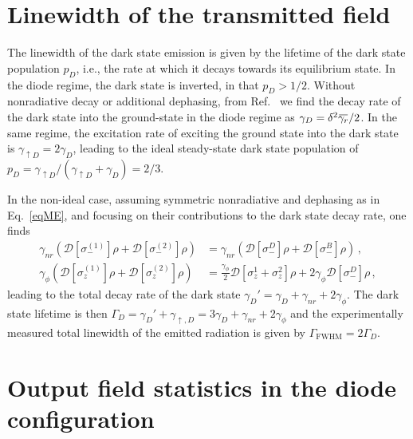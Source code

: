 \documentclass[pra, twocolumn, amsmath, amssymb, notitlepage, longbibliography, showpacs, superscriptaddress]{revtex4-1}
\newcommand{\nn}{\nonumber}							%
\newcommand{\diss}[1]{\mathcal{D}[ #1 ]}					%
\renewcommand{\l}[0]{\left}
\renewcommand{\r}[0]{\right}
\newcommand{\overbar}[1]{\mkern 1.5mu\overline{\mkern-1.5mu#1\mkern-1.5mu}\mkern 1.5mu}
\begin{document}
\section{Linewidth of the transmitted field}

The linewidth of the dark state emission is given by the lifetime of the 
dark state population $p_{D}$, i.e., the rate at which it decays towards its equilibrium state. 
In the diode regime, the dark state is inverted, in that $p_{D}>1/2$. Without nonradiative decay or additional dephasing, from Ref.~\cite{Muller2017a} we find
the decay rate of the dark state into the ground-state in the diode regime as 
$\gamma_{D} = \delta^{2} \overbar{\gamma_{r}} /2$. 
In the same regime, the excitation rate of exciting the 
ground state into the dark state is $\gamma_{\uparrow D} = 2\gamma_{D}$, 
leading to the ideal steady-state dark state population of 
$p_{D} = \gamma_{\uparrow D} / (\gamma_{\uparrow D} + \gamma_{D})  = 2/3$. 

In the non-ideal case, assuming symmetric nonradiative and dephasing as in Eq.~\eqref{eqME}, 
and focusing on their contributions to the dark state decay rate, 
one finds 
\begin{align}
	\gamma_{nr} \l( \diss{\sigma_{-}^{(1)}}\rho + \diss{\sigma_{-}^{(2)}}\rho \r) &= \gamma_{nr} \l( \diss{\sigma_{-}^{D}}\rho +\diss{\sigma_{-}^{B}}\rho \r) \,, \\
	\gamma_{\phi} \l( \diss{\sigma_{z}^{(1)}}\rho + \diss{\sigma_{z}^{(2)}}\rho \r) %
		&= \frac{\gamma_{\phi}}{2} \diss{\sigma_{z}^{1}+\sigma_{z}^{2}}\rho +2 \gamma_{\phi} \diss{\sigma_{-}^{D}}\rho \,, 
\end{align}
leading to the total decay rate of the dark state $\gamma_{D}' = \gamma_{D} +\gamma_{nr} + 2\gamma_{\phi}$. The dark state lifetime is then
$\Gamma_{D} = \gamma_{D}' + \gamma_{\uparrow,D} = 3\gamma_{D} + \gamma_{nr} + 2\gamma_{\phi}$ and the experimentally measured total linewidth of the emitted radiation is given by 
$\Gamma_\textrm{FWHM} = 2\Gamma_{D}$.

\section{Output field statistics in the diode configuration}
\end{document}
